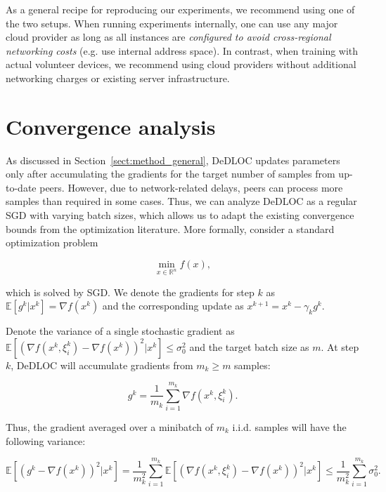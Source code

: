 As a general recipe for reproducing our experiments, we recommend using one of the two setups. When running experiments internally, one can use any major cloud provider as long as all instances are \textit{configured to avoid cross-regional networking costs} (e.g. use internal address space).
In contrast, when training with actual volunteer devices, we recommend using cloud providers without additional networking charges or existing server infrastructure.

\section{Convergence analysis}
\label{appendix:convergence_analysis}
As discussed in Section~\ref{sect:method_general}, DeDLOC updates parameters only after accumulating the gradients for the target number of samples from up-to-date peers. However, due to network-related delays, peers can process more samples than required in some cases. Thus, we can analyze DeDLOC as a regular SGD with varying batch sizes, which allows us to adapt the existing convergence bounds from the optimization literature. More formally, consider a standard optimization problem

\begin{equation}
    \min_{x\in\mathbb{R}^n} f(x),
\end{equation}

which is solved by SGD. We denote the gradients for step $k$ as $\mathbb{E}[g^k|x^k]=\nabla f(x^k)$ and the corresponding update as $x^{k+1}=x^k-\gamma_k g^k$.

Denote the variance of a single stochastic gradient as $\mathbb{E}\left[\left(\nabla f(x^k,\xi_i^k)-\nabla f(x^k)\right)^2|x^k\right]\leq \sigma_0^2$ and the target batch size as $m$. At step $k$, DeDLOC will accumulate gradients from $m_k\geq m$ samples:

\begin{equation}
    g^k=\frac{1}{m_k}\sum_{i=1}^{m_k}\nabla f(x^k,\xi_i^k).
\end{equation}

Thus, the gradient averaged over a minibatch of $m_k$ i.i.d. samples will have the following variance:

\begin{equation}
    \mathbb{E}\left[\left(g^k-\nabla f(x^k)\right)^2| x^k\right]=\frac{1}{m_k^2}\sum_{i=1}^{m_k}\mathbb{E}\left[\left(\nabla f(x^k,\xi_i^k)-\nabla f(x^k)\right)^2| x^k\right]\leq \frac{1}{m_k^2}\sum_{i=1}^{m_k}\sigma_0^2.
\end{equation}

